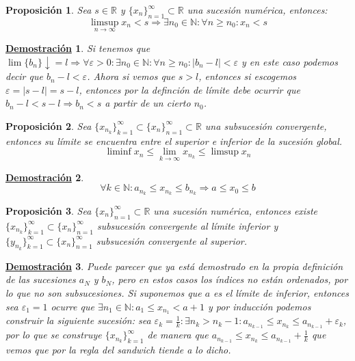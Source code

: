 \documentclass[10pt,a4paper,openright]{book}
\theoremstyle{break}
\newtheorem{prop}{Proposición}[chapter]
\newtheorem*{demo}{\underline{Demostración}}
\begin{document}
\begin{prop}
Sea $s\in \mathbb{R}$ y $\{x_n\}_{n=1}^\infty\subset \mathbb{R}$ una sucesión numérica, entonces:
\[
\limsup_{n\rightarrow\infty} x_n < s \Rightarrow \exists n_0 \in \mathbb{N} : \forall n \geq n_0: x_n<s
\]
\end{prop}
\begin{demo}
Si tenemos que $\lim \{b_n\}\downarrow = l\Rightarrow \forall \varepsilon>0 : \exists n_0\in \mathbb N: \forall n\geq n_0: |b_n-l|<\varepsilon $ y en este caso podemos decir que $b_n-l<\varepsilon$. Ahora si vemos que $s>l$, entonces si escogemos $\varepsilon = |s-l|=s-l$, entonces por la definción de límite debe ocurrir que $b_n-l<s-l\Rightarrow b_n<s$ a partir de un cierto $n_0$.
\end{demo}

\begin{prop}
Sea $\{x_{n_k}\}_{k=1}^\infty\subset \{x_n\}_{n=1}^\infty\subset \mathbb{R}$ una subsucesión convergente, entonces su límite se encuentra entre el superior e inferior de la sucesión global.
\[
\liminf x_n \leq \lim_{k\rightarrow \infty} x_{n_k} \leq \limsup x_n
\]
\end{prop}
\begin{demo}
$$\forall k\in \mathbb N: a_{n_k}\leq x_{n_k} \leq b_{n_k} \Rightarrow a\leq x_0 \leq b$$
\end{demo}

\begin{prop}
Sea $\{x_n\}_{n=1}^\infty \subset \mathbb{R}$ una sucesión numérica, entonces existe $\{x_{n_k}\}_{k=1}^\infty\subset \{x_n\}_{n=1}^\infty$ subsucesión convergente al límite inferior y $\{y_{n_k}\}_{k=1}^\infty\subset \{x_n\}_{n=1}^\infty$ subsucesión convergente al superior.
\end{prop}
\begin{demo}
Puede parecer que ya está demostrado en la propia definición de las sucesiones $a_N$ y $b_N$, pero en estos casos los índices no están ordenados, por lo que no son subsucesiones.
Si suponemos que $a$ es el límite de inferior, entonces sea $\varepsilon_1=1$ ocurre que $\exists n_1\in \mathbb N: a_1\leq x_{n_1}<a+1$ y por inducción podemos construir la siguiente sucesión: sea $\varepsilon_k= \frac{1}{k} : \exists n_k > n_k -1: a_{n_{k-1}}\leq x_{n_k}\leq a_{n_{k-1}}+\varepsilon_k$, por lo que se construye $\{x_{n_k}\}_{k=1}^\infty$ de manera que $a_{n_{k-1}}\leq x_{n_k}\leq a_{n_{k-1}}+\frac{1}{k}$ que vemos que por la regla del sandwich tiende a lo dicho.
\end{demo}
\end{document}
